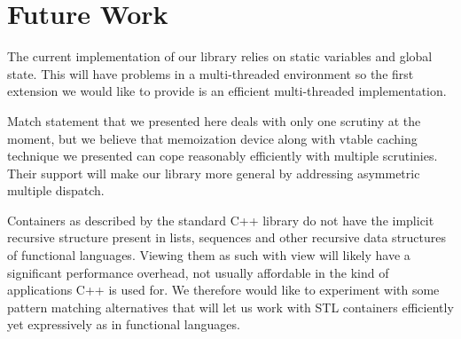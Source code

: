 \documentclass[preprint]{sigplanconf}
\begin{document}

\section{Future Work} %
\label{sec:fw}

The current implementation of our library relies on static variables and global 
state. This will have problems in a multi-threaded environment so the first 
extension we would like to provide is an efficient multi-threaded 
implementation.

Match statement that we presented here deals with only one scrutiny at the 
moment, but we believe that memoization device along with vtable caching 
technique we presented can cope reasonably efficiently with multiple scrutinies. 
Their support will make our library more general by addressing asymmetric 
multiple dispatch.

Containers as described by the standard C++ library do not have the implicit 
recursive structure present in lists, sequences and other recursive data 
structures of functional languages. Viewing them as such with view will likely 
have a significant performance overhead, not usually affordable in the kind of 
applications C++ is used for. We therefore would like to experiment with some 
pattern matching alternatives that will let us work with STL containers 
efficiently yet expressively as in functional languages.
\end{document}
